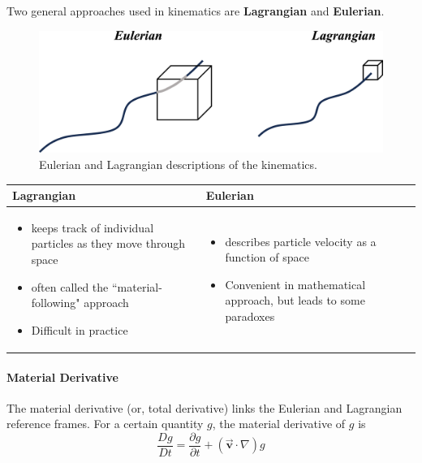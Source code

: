 \documentclass[12pt, a4paper]{article}
\numberwithin{equation}{subsection}
\begin{document}
Two general approaches used in kinematics are \textbf{Lagrangian} and \textbf{Eulerian}.

\begin{figure}[H]
    \centering
    \includegraphics[width=.7\textwidth]{img/lagrangian_eulerian.eps}
    \caption{Eulerian and Lagrangian descriptions of the kinematics.}
\end{figure}

\begin{table}[H]
    \centering
    \begin{tabularx}{\textwidth}{X|X}
         \textbf{Lagrangian} & \textbf{Eulerian} \\ \hline
        \begin{itemize}
           \item keeps track of individual particles as they move through space 
           \item often called the ``material-following" approach
           \item Difficult in practice
        \end{itemize}
        & 
        \begin{itemize}
            \item describes particle velocity as a function of space
            \item Convenient in mathematical approach, but leads to some paradoxes
        \end{itemize} 
    \end{tabularx}
\end{table}

\paragraph{Material Derivative} The material derivative (or, total derivative) links the Eulerian and Lagrangian reference frames. For a certain quantity $g$, the material derivative of $g$ is
\[ 
    \frac{Dg}{Dt} = \frac{\partial g}{\partial t}+ (\vec{\bm{v}} \cdot \nabla)g 
\]
 
\end{document}
